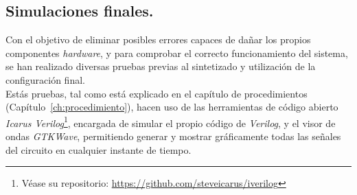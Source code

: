 \subsection{Simulaciones finales.}
Con el objetivo de eliminar posibles errores capaces de dañar los propios componentes \emph{hardware}, y para comprobar el correcto funcionamiento del sistema, se han realizado diversas pruebas previas al sintetizado y utilización de la configuración final. \\
Estás pruebas, tal como está explicado en el capítulo de procedimientos (Capítulo~\ref{ch:procedimiento}), hacen uso de las herramientas de código abierto \emph{Icarus Verilog}\footnote{Véase su repositorio: \url{https://github.com/steveicarus/iverilog}}, encargada de simular el propio código de \emph{Verilog}, y el visor de ondas \emph{GTKWave}, permitiendo generar y mostrar gráficamente todas las señales del circuito en cualquier instante de tiempo.

